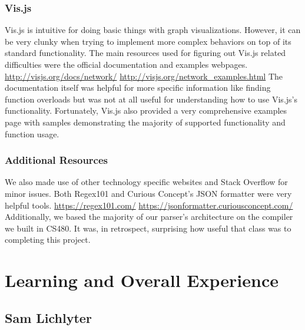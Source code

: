 \documentclass[letterpaper,10pt,titlepage,draftclsnofoot,onecolumn,onesided] {IEEEtran}
\begin{document}
\subsubsection{Vis.js}
Vis.js is intuitive for doing basic things with graph visualizations. 
However, it can be very clunky when trying to implement more complex behaviors on top of its standard functionality. 
The main resources used for figuring out Vis.js related difficulties were the official documentation and examples webpages.
\url{http://visjs.org/docs/network/}
\url{http://visjs.org/network_examples.html}
The documentation itself was helpful for more specific information like finding function overloads but was not at all useful for understanding how to use Vis.js's functionality. 
Fortunately, Vis.js also provided a very comprehensive examples page with samples demonstrating the majority of supported functionality and function usage. \\

\subsubsection{Additional Resources}
We also made use of other technology specific websites and Stack Overflow for minor issues.
Both Regex101 and Curious Concept's JSON formatter were very helpful tools.
\url{https://regex101.com/}
\url{https://jsonformatter.curiousconcept.com/}
Additionally, we based the majority of our parser’s architecture on the compiler we built in CS480. 
It was, in retrospect, surprising how useful that class was to completing this project.


\section{Learning and Overall Experience}

\subsection{Sam Lichlyter}
\end{document}

